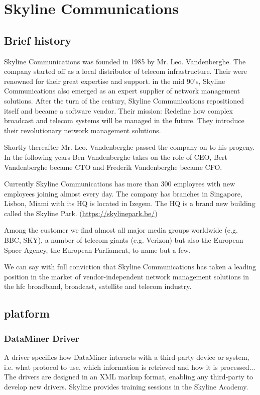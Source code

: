 
\chapter{Skyline Communications}
\section{Brief history}

Skyline Communications was founded in 1985 by Mr. Leo. Vandenberghe. The company started off as a local distributor of telecom infrastructure. Their were renowned for their great expertise and support. in the mid 90's, Skyline Communications also emerged as an expert supplier of network management solutions. After the turn of the century, Skyline Communications repositioned itself and became a software vendor. Their mission: Redefine how complex broadcast and telecom systems will be managed in the future. They introduce their revolutionary \dm network management solutions.

Shortly thereafter Mr. Leo. Vandenberghe passed the company on to his progeny. In the following years Ben Vandenberghe takes on the role of CEO, Bert Vandenberghe became CTO and Frederik Vandenberghe became CFO. 

Currently Skyline Communications has more than 300 employees with new employees joining almost every day. 
The company has branches in Singapore, Lisbon, Miami with its HQ is located in Izegem. 
The HQ is a brand new building called the Skyline Park. (\url{https://skylinepark.be/})

Among the customer we find almost all major media groups worldwide (e.g. BBC, SKY), a number of telecom giants (e.g. Verizon) but also the European Space Agency, the European Parliament, to name but a few. 

We can say with full conviction that Skyline Communications has taken a leading position in the market of vendor-independent network management solutions in the \gls{hfc} broadband, broadcast, satellite and telecom industry. 

\section{\dm platform}


\subsection{DataMiner Driver}
A driver specifies how DataMiner interacts with a third-party device or system, i.e. what protocol to use, which information is retrieved and how it is processed... The drivers are designed in an XML markup format, enabling any third-party to develop new drivers. Skyline provides training sessions in the Skyline Academy. 

